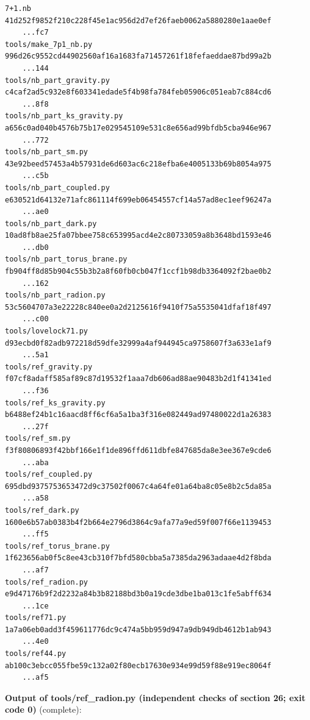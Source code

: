 \documentclass[10pt,a4paper]{article}
\begin{document}
\begin{Verbatim}[fontsize=\small,frame=single,framesep=2mm]
7+1.nb                             41d252f9852f210c228f45e1ac956d2d7ef26faeb0062a5880280e1aae0ef
    ...fc7
tools/make_7p1_nb.py               996d26c9552cd44902560af16a1683fa71457261f18fefaeddae87bd99a2b
    ...144
tools/nb_part_gravity.py           c4caf2ad5c932e8f603341edade5f4b98fa784feb05906c051eab7c884cd6
    ...8f8
tools/nb_part_ks_gravity.py        a656c0ad040b4576b75b17e029545109e531c8e656ad99bfdb5cba946e967
    ...772
tools/nb_part_sm.py                43e92beed57453a4b57931de6d603ac6c218efba6e4005133b69b8054a975
    ...c5b
tools/nb_part_coupled.py           e630521d64132e71afc861114f699eb06454557cf14a57ad8ec1eef96247a
    ...ae0
tools/nb_part_dark.py              10ad8fb8ae25fa07bbee758c653995acd4e2c80733059a8b3648bd1593e46
    ...db0
tools/nb_part_torus_brane.py       fb904ff8d85b904c55b3b2a8f60fb0cb047f1ccf1b98db3364092f2bae0b2
    ...162
tools/nb_part_radion.py            53c5604707a3e22228c840ee0a2d2125616f9410f75a5535041dfaf18f497
    ...c00
tools/lovelock71.py                d93ecbd0f82adb972218d59dfe32999a4af944945ca9758607f3a633e1af9
    ...5a1
tools/ref_gravity.py               f07cf8adaff585af89c87d19532f1aaa7db606ad88ae90483b2d1f41341ed
    ...f36
tools/ref_ks_gravity.py            b6488ef24b1c16aacd8ff6cf6a5a1ba3f316e082449ad97480022d1a26383
    ...27f
tools/ref_sm.py                    f3f80806893f42bbf166e1f1de896ffd611dbfe847685da8e3ee367e9cde6
    ...aba
tools/ref_coupled.py               695dbd9375753653472d9c37502f0067c4a64fe01a64ba8c05e8b2c5da85a
    ...a58
tools/ref_dark.py                  1600e6b57ab0383b4f2b664e2796d3864c9afa77a9ed59f007f66e1139453
    ...ff5
tools/ref_torus_brane.py           1f623656ab0f5c8ee43cb310f7bfd580cbba5a7385da2963adaae4d2f8bda
    ...af7
tools/ref_radion.py                e9d47176b9f2d2232a84b3b82188bd3b0a19cde3dbe1ba013c1fe5abff634
    ...1ce
tools/ref71.py                     1a7a06eb0add3f459611776dc9c474a5bb959d947a9db949db4612b1ab943
    ...4e0
tools/ref44.py                     ab100c3ebcc055fbe59c132a02f80ecb17630e934e99d59f88e919ec8064f
    ...af5
\end{Verbatim}
\textbf{Output of tools/ref\_radion.py (independent checks of section 26; exit code 0)} (complete):
\end{document}
